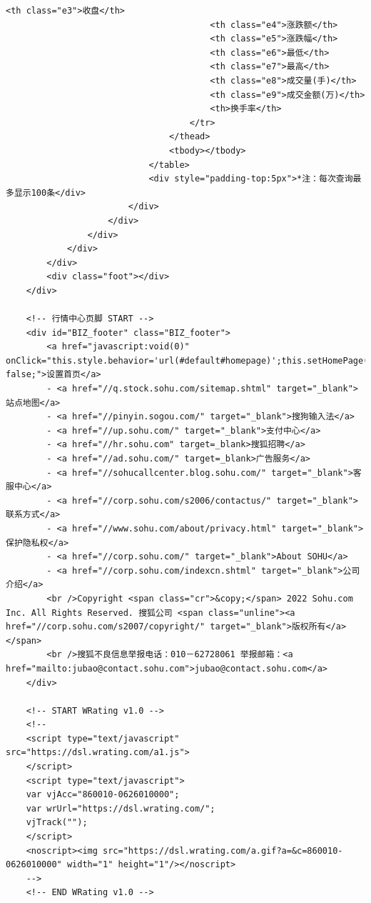 \documentclass[UTF8,12pt]{article}
\begin{document}
\begin{lstlisting}[title=股票代码300117的界面html源码,frame=shadowbox]
                                        <th class="e3">收盘</th>
                                        <th class="e4">涨跌额</th>
                                        <th class="e5">涨跌幅</th>
                                        <th class="e6">最低</th>
                                        <th class="e7">最高</th>
                                        <th class="e8">成交量(手)</th>
                                        <th class="e9">成交金额(万)</th>
                                        <th>换手率</th>
                                    </tr>
                                </thead>
                                <tbody></tbody>
                            </table>
                            <div style="padding-top:5px">*注：每次查询最多显示100条</div>
                        </div>
                    </div>
                </div>
            </div>
        </div>
        <div class="foot"></div>
    </div>
    
    <!-- 行情中心页脚 START -->
    <div id="BIZ_footer" class="BIZ_footer">
        <a href="javascript:void(0)" onClick="this.style.behavior='url(#default#homepage)';this.setHomePage('//www.sohu.com');return false;">设置首页</a>
        - <a href="//q.stock.sohu.com/sitemap.shtml" target="_blank">站点地图</a>
        - <a href="//pinyin.sogou.com/" target="_blank">搜狗输入法</a>
        - <a href="//up.sohu.com/" target="_blank">支付中心</a>
        - <a href="//hr.sohu.com" target=_blank>搜狐招聘</a>
        - <a href="//ad.sohu.com/" target=_blank>广告服务</a>
        - <a href="//sohucallcenter.blog.sohu.com/" target="_blank">客服中心</a>
        - <a href="//corp.sohu.com/s2006/contactus/" target="_blank">联系方式</a>
        - <a href="//www.sohu.com/about/privacy.html" target="_blank">保护隐私权</a>
        - <a href="//corp.sohu.com/" target="_blank">About SOHU</a>
        - <a href="//corp.sohu.com/indexcn.shtml" target="_blank">公司介绍</a>
        <br />Copyright <span class="cr">&copy;</span> 2022 Sohu.com Inc. All Rights Reserved. 搜狐公司 <span class="unline"><a href="//corp.sohu.com/s2007/copyright/" target="_blank">版权所有</a></span>
        <br />搜狐不良信息举报电话：010－62728061 举报邮箱：<a href="mailto:jubao@contact.sohu.com">jubao@contact.sohu.com</a>
    </div>
    
    <!-- START WRating v1.0 -->
    <!--
    <script type="text/javascript" src="https://dsl.wrating.com/a1.js">
    </script>
    <script type="text/javascript">
    var vjAcc="860010-0626010000";
    var wrUrl="https://dsl.wrating.com/";
    vjTrack("");
    </script>
    <noscript><img src="https://dsl.wrating.com/a.gif?a=&c=860010-0626010000" width="1" height="1"/></noscript>
    -->
    <!-- END WRating v1.0 -->
    

\end{lstlisting}
\end{document}
